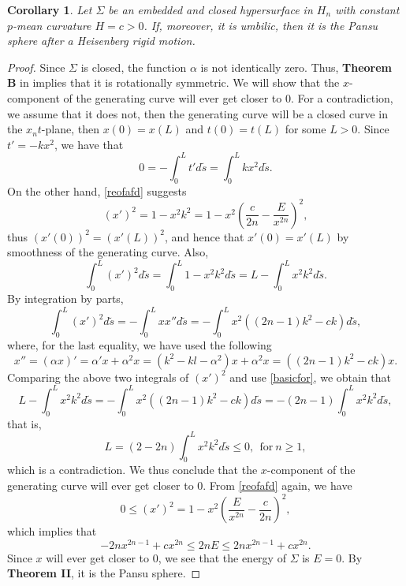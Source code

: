 \documentclass[12pt]{amsart}
\newtheorem{cor}[thm]{\sc Corollary}
\theoremstyle{definition}\newtheorem{exa}[thm]{\sc Example}
\theoremstyle{definition}\newtheorem{de}[thm]{\sc Definition}
\theoremstyle{definition}\newtheorem{rem}[thm]{\sc Remark}
\theoremstyle{definition}\newtheorem{prob}[thm]{\it Problem}
\theoremstyle{definition}\newtheorem{fact}[thm]{\sc Fact}
\theoremstyle{definition}\newtheorem{claim}[thm]{\sc Claim}
\numberwithin{equation}{section}
\begin{document}
\begin{cor}\label{co2}
Let $\Sigma$ be an embedded and closed hypersurface in $H_{n}$ with constant $p$-mean curvature $H=c>0$. If, moreover, it is umbilic, then it is the Pansu sphere after a Heisenberg rigid motion. 
\end{cor}
\begin{proof}
Since $\Sigma$ is closed, the function $\alpha$ is not identically zero. Thus, {\bf Theorem B} in \cite{CCHY2} implies that it is rotationally symmetric. We will show that the $x$-component of the generating curve will ever get closer to $0$. For a contradiction, we assume that it does not, then the generating curve will be a closed curve in the $x_{n}t$-plane, then $x(0)=x(L)$ and $t(0)=t(L)$ for some $L>0$. Since $t'=-kx^{2}$, we have that
\begin{equation}\label{basicfor}
0=-\int_{0}^{L} t' d\tilde{s}=\int_{0}^{L} kx^{2} d\tilde{s}.
\end{equation}
On the other hand, \eqref{reofafd} suggests
\begin{equation*}
(x')^{2}=1-x^{2}k^{2}=1-x^{2}\left(\frac{c}{2n}-\frac{E}{x^{2n}}\right)^{2},
\end{equation*}
thus $(x'(0))^{2}=(x'(L))^{2}$, and hence that $x'(0)=x'(L)$ by smoothness of the generating curve. Also,
\begin{equation*}
\int_{0}^{L}(x')^{2} d\tilde{s}=\int_{0}^{L}1-x^{2}k^{2} d\tilde{s}=L-\int_{0}^{L}x^{2}k^{2} d\tilde{s}.
\end{equation*}
By integration by parts, 
\begin{equation*}
\int_{0}^{L}(x')^{2} d\tilde{s}=-\int_{0}^{L} xx'' d\tilde{s}=-\int_{0}^{L} x^{2}((2n-1)k^{2}-ck) d\tilde{s},
\end{equation*}
where, for the last equality, we have used the following
\[x''=(\alpha x)'=\alpha'x+\alpha^{2}x=(k^{2}-kl-\alpha^{2})x+\alpha^{2}x=((2n-1)k^{2}-ck)x.\]
Comparing the above two integrals of $(x')^2$ and use \eqref{basicfor}, we obtain that
\[L-\int_{0}^{L}x^{2}k^{2} d\tilde{s}=-\int_{0}^{L} x^{2}((2n-1)k^{2}-ck) d\tilde{s}=-(2n-1)\int_{0}^{L} x^{2}k^{2} d\tilde{s},\]
that is,
\[L=(2-2n)\int_{0}^{L} x^{2}k^{2} d\tilde{s}\leq 0,\ \ \textrm{for}\ n\geq1,\]
which is a contradiction. We thus conclude that the $x$-component of the generating curve will ever get closer to $0$. From \eqref{reofafd} again, we have
\begin{equation*}
0\leq (x')^{2}=1-x^{2}\left(\frac{E}{x^{2n}}-\frac{c}{2n}\right)^{2}, 
\end{equation*}
which implies that 
\[-2nx^{2n-1}+cx^{2n}\leq 2nE\leq 2nx^{2n-1}+cx^{2n}.\]
Since $x$ will ever get closer to $0$, we see that the energy of $\Sigma$ is $E=0$. By {\bf Theorem II}, it is the Pansu sphere.
\end{proof}
\end{document}
